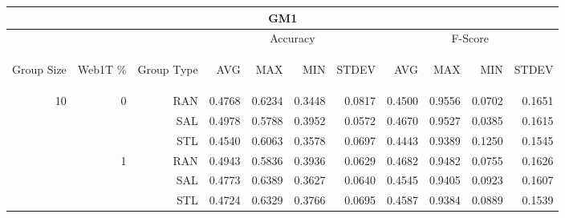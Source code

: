 \begin{center}
\begin{table}[htbp] 
 \begin{center}
\begin{tabular}{ | r | r | r | r | r | r | r | r | r | r | r |}
\hline
\multicolumn{11}{|c|}{GM1}\\
\hline
 & & & \multicolumn{4}{|c|}{Accuracy} & \multicolumn{4}{|c|}{F-Score}\\ \cline{4-11}
\begin{sideways}Group Size\end{sideways} & \begin{sideways}Web1T \%\end{sideways} & \begin{sideways}Group Type\end{sideways} & \begin{sideways}AVG\end{sideways} & \begin{sideways}MAX\end{sideways} & \begin{sideways}MIN\end{sideways} & \begin{sideways}STDEV\end{sideways} & \begin{sideways}AVG\end{sideways} & \begin{sideways}MAX\end{sideways} & \begin{sideways}MIN\end{sideways} & \begin{sideways}STDEV\end{sideways}\\
\hline
\multirow{18}{*}{10}
 & \multirow{3}{*}{0} & RAN & 0.4768 & 0.6234 & 0.3448 & 0.0817 & 0.4500 & 0.9556 & 0.0702 & 0.1651\\ \cline{3-11}
 &   & SAL & 0.4978 & 0.5788 & 0.3952 & 0.0572 & 0.4670 & 0.9527 & 0.0385 & 0.1615\\ \cline{3-11}
 &   & STL & 0.4540 & 0.6063 & 0.3578 & 0.0697 & 0.4443 & 0.9389 & 0.1250 & 0.1545\\ \cline{2-11}
 & \multirow{3}{*}{1} & RAN & 0.4943 & 0.5836 & 0.3936 & 0.0629 & 0.4682 & 0.9482 & 0.0755 & 0.1626\\ \cline{3-11}
 &   & SAL & 0.4773 & 0.6389 & 0.3627 & 0.0640 & 0.4545 & 0.9405 & 0.0923 & 0.1607\\ \cline{3-11}
 &   & STL & 0.4724 & 0.6329 & 0.3766 & 0.0695 & 0.4587 & 0.9384 & 0.0889 & 0.1539\\ \cline{2-11}

\end{tabular}
\end{center}
\end{table}
\end{center}
